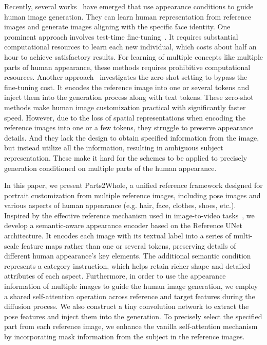 Recently, several works~\cite{ruiz2023dreambooth, hu2021lora, gal2022textualinversion, kumari2023customdiffusion, liu2023cones, shi2023instantbooth, ye2023ipadapter, chen2023anydoor, li2023photomaker, wang2024instantid, zhang2024ssrencoder} have emerged that use appearance conditions to guide human image generation. They can learn human representation from reference images and generate images aligning with the specific face identity. One prominent approach involves test-time fine-tuning~\cite{ruiz2023dreambooth, hu2021lora, gal2022textualinversion, kumari2023customdiffusion, liu2023cones}. It requires substantial computational resources to learn each new individual, which costs about half an hour to achieve satisfactory results. For learning of multiple concepts like multiple parts of human appearance, these methods requires prohibitive computational resources. Another approach~\cite{shi2023instantbooth, ye2023ipadapter, chen2023anydoor, li2023photomaker, wang2024instantid, zhang2024ssrencoder} investigates the zero-shot setting to bypass the fine-tuning cost. It encodes the reference image into one or several tokens and inject them into the generation process along with text tokens. These zero-shot methods make human image customization practical with significantly faster speed. However, due to the loss of spatial representations when encoding the reference images into one or a few tokens, they struggle to preserve appearance details. And they lack the design to obtain specified information from the image, but instead utilize all the information, resulting in ambiguous subject representation. These make it hard for the schemes to be applied to precisely generation conditioned on multiple parts of the human appearance.

In this paper, we present Parts2Whole, a unified reference framework designed for portrait customization from multiple reference images, including pose images and various aspects of human appearance (e.g. hair, face, clothes, shoes, etc.). Inspired by the effective reference mechanism used in image-to-video tasks~\cite{hu2023animateanyone, xu2023magicanimate}, we develop a semantic-aware appearance encoder based on the Reference UNet architecture. It encodes each image with its textual label into a series of multi-scale feature maps rather than one or several tokens, preserving details of different human appearance's key elements. The additional semantic condition represents a category instruction, which helps retain richer shape and detailed attributes of each aspect. Furthermore, in order to use the appearance information of multiple images to guide the human image generation, we employ a shared self-attention operation across reference and target features during the diffusion process. We also construct a tiny convolution network to extract the pose features and inject them into the generation. To precisely select the specified part from each reference image, we enhance the vanilla self-attention mechanism by incorporating mask information from the subject in the reference images.

